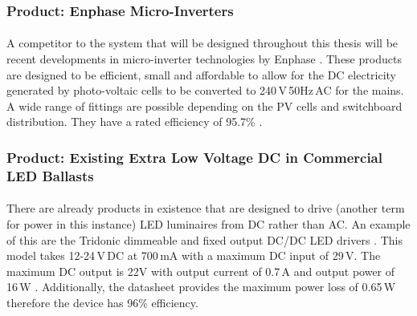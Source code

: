 \subsubsection{Product: Enphase Micro-Inverters}

\paragraph{}
A competitor to the system that will be designed throughout this thesis will be recent developments in micro-inverter technologies by Enphase \cite{website:Enphase}. These products are designed to be efficient, small and affordable to allow for the DC electricity generated by photo-voltaic cells to be converted to 240\,V\,50Hz\,AC for the mains. A wide range of fittings are possible depending on the PV cells and switchboard distribution. They have a rated efficiency of 95.7\% \cite{website:Enphase}. 

\subsubsection{Product: Existing Extra Low Voltage DC in Commercial LED Ballasts}

\paragraph{}
There are already products in existence that are designed to drive (another term for power in this instance) LED luminaires from DC rather than AC. An example of this are the Tridonic dimmeable and fixed output DC/DC LED drivers \cite{website:Tridonic1}. This model takes 12-24\,V\,DC at 700\,mA with a maximum DC input of 29\,V. The maximum DC output is 22V with output current of 0.7\,A and output power of 16\,W \cite{website:Tridonic1}. Additionally, the datasheet provides the maximum power loss of 0.65\,W therefore the device has 96\% efficiency.     
 
\newpage